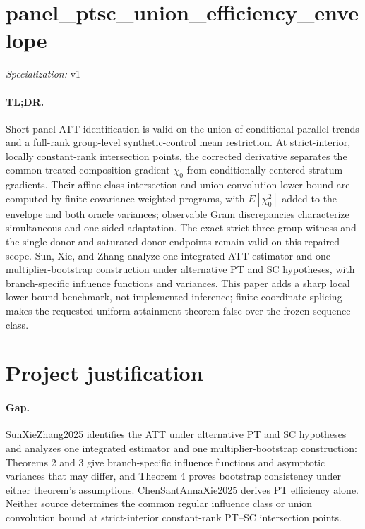 \documentclass{article}
\begin{document}
\sloppy

\section*{panel\_\allowbreak{}ptsc\_\allowbreak{}union\_\allowbreak{}efficiency\_\allowbreak{}envelope}

\noindent\textit{Specialization:} v1\par

\paragraph{TL;DR.} Short-panel ATT identification is valid on the union of conditional parallel trends and a full-rank group-level synthetic-control mean restriction. At strict-interior, locally constant-rank intersection points, the corrected derivative separates the common treated-composition gradient \(\chi_0\) from conditionally centered stratum gradients. Their affine-class intersection and union convolution lower bound are computed by finite covariance-weighted programs, with \(E[\chi_0^2]\) added to the envelope and both oracle variances; observable Gram discrepancies characterize simultaneous and one-sided adaptation. The exact strict three-group witness and the single-donor and saturated-donor endpoints remain valid on this repaired scope. Sun, Xie, and Zhang analyze one integrated ATT estimator and one multiplier-bootstrap construction under alternative PT and SC hypotheses, with branch-specific influence functions and variances. This paper adds a sharp local lower-bound benchmark, not implemented inference; finite-coordinate splicing makes the requested uniform attainment theorem false over the frozen sequence class.

\section{Project justification}

\paragraph{Gap.} SunXieZhang2025 identifies the ATT under alternative PT and SC hypotheses and analyzes one integrated estimator and one multiplier-bootstrap construction: Theorems 2 and 3 give branch-specific influence functions and asymptotic variances that may differ, and Theorem 4 proves bootstrap consistency under either theorem's assumptions. ChenSantAnnaXie2025 derives PT efficiency alone. Neither source determines the common regular influence class or union convolution bound at strict-interior constant-rank PT--SC intersection points.
\end{document}
